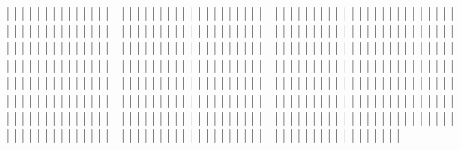   |
  |
  |
  |
  |
  |
  |
  |
  |
  |
  |
  |
  |
  |
  |
  |
  |
  |
  |
  |
  |
  |
  |
  |
  |
  |
  |
  |
  |
  |
  |
  |
  |
  |
  |
  |
  |
  |
  |
  |
  |
  |
  |
  |
  |
  |
  |
  |
  |
  |
  |
  |
  |
  |
  |
  |
  |
  |
  |
  |
  |
  |
  |
  |
  |
  |
  |
  |
  |
  |
  |
  |
  |
  |
  |
  |
  |
  |
  |
  |
  |
  |
  |
  |
  |
  |
  |
  |
  |
  |
  |
  |
  |
  |
  |
  |
  |
  |
  |
  |
  |
  |
  |
  |
  |
  |
  |
  |
  |
  |
  |
  |
  |
  |
  |
  |
  |
  |
  |
  |
  |
  |
  |
  |
  |
  |
  |
  |
  |
  |
  |
  |
  |
  |
  |
  |
  |
  |
  |
  |
  |
  |
  |
  |
  |
  |
  |
  |
  |
  |
  |
  |
  |
  |
  |
  |
  |
  |
  |
  |
  |
  |
  |
  |
  |
  |
  |
  |
  |
  |
  |
  |
  |
  |
  |
  |
  |
  |
  |
  |
  |
  |
  |
  |
  |
  |
  |
  |
  |
  |
  |
  |
  |
  |
  |
  |
  |
  |
  |
  |
  |
  |
  |
  |
  |
  |
  |
  |
  |
  |
  |
  |
  |
  |
  |
  |
  |
  |
  |
  |
  |
  |
  |
  |
  |
  |
  |
  |
  |
  |
  |
  |
  |
  |
  |
  |
  |
  |
  |
  |
  |
  |
  |
  |
  |
  |
  |
  |
  |
  |
  |
  |
  |
  |
  |
  |
  |
  |
  |
  |
  |
  |
  |
  |
  |
  |
  |
  |
  |
  |
  |
  |
  |
  |
  |
  |
  |
  |
  |
  |
  |
  |
  |
  |
  |
  |
  |
  |
  |
  |
  |
  |
  |
  |
  |
  |
  |
  |
  |
  |
  |
  |
  |
  |
  |
  |
  |
  |
  |
  |
  |
  |
  |
  |
  |
  |
  |
  |
  |
  |
  |
  |
  |
  |
  |
  |
  |
  |
  |
  |
  |
  |
  |
  |
  |
  |
  |
  |
  |
  |
  |
  |
  |
  |
  |
  |
  |
  |
  |
  |
  |
  |
  |
  |
  |
  |
  |
  |
  |
  |
  |
  |
  |
  |
  |
  |
  |
  |
  |
  |
  |
  |
  |
  |
  |
  |
  |
  |
  |
  |
  |
  |
  |
  |
  |
  |
  |
  |
  |
  |
  |
  |
  |
  |
  |
  |
  |
  |
  |
  |
  |
  |
  |
  |
  |
  |
  |
  |
  |
  |
  |
  |
  |
  |
  |
  |
  |
  |
  |
  |
  |
  |
  |
  |
  |
  |
  |
  |
  |
  |
  |
  |
  |
  |
  |
  |
  |
  |
  |
  |
  |
  |
  |
  |
  |
  |
  |
  |
  |
  |
  |
  |
  |
  |
  |
  |
  |
  |
  |
  |
  |
  |
  |
  |
  |